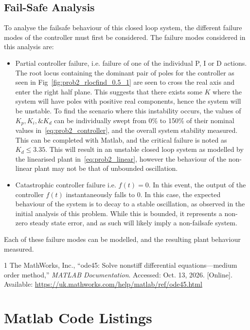 \documentclass[11pt,a4paper]{article}
\begin{document}
\subsection{Fail-Safe Analysis}
To analyse the failsafe behaviour of this closed loop system, the different failure modes of the controller must first be considered. The failure modes considered in this analysis are:
\begin{itemize}
    \item Partial controller failure, i.e. failure of one of the individual P, I or D actions. The root locus containing the dominant pair of poles for the controller as seen in Fig~\ref{fig:prob2_rlocfind_0.5_1} are seen to cross the real axis and enter the right half plane. This suggests that there exists some $K$ where the system will have poles with positive real components, hence the system will be unstable. To find the scenario where this instability occurs, the values of $K_p, K_i, \& K_d$ can be individually swept from 0\% to 150\% of their nominal values in~\eqref{eq:prob2_controller}, and the overall system stability measured. This can be completed with Matlab, and the critical failure is noted as $K_d \le 3.35$. This will result in an unstable closed loop system as modelled by the linearised plant in~\ref{eq:prob2_linear}, however the behaviour of the non-linear plant may not be that of unbounded oscillation.
    \item Catastrophic controller failure i.e. $f(t)= 0$. In this event, the output of the controller $f(t)$ instantaneously falls to 0. In this case, the expected behaviour of the system is to decay to a stable oscillation, as observed in the initial analysis of this problem. While this is bounded, it represents a non-zero steady state error, and as such will likely imply a non-failsafe system. 
\end{itemize}
Each of these failure modes can be modelled, and the resulting plant behaviour measured. 

\newpage
\begin{thebibliography}{1}
    The MathWorks, Inc., ``ode45: Solve nonstiff differential equations---medium order method,''
    \textit{MATLAB Documentation}. Accessed: Oct. 13, 2026. [Online]. Available:
    \url{https://uk.mathworks.com/help/matlab/ref/ode45.html}
\end{thebibliography}

\newpage
\appendix
\section{Matlab Code Listings}
\end{document}

